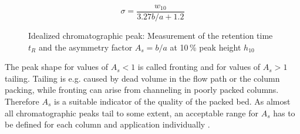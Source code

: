 \begin{equation}
\sigma=\frac{w_{10}}{3.27 b/a + 1.2}
\label{eq:Gaus_dev}
\end{equation}

\begin{figure}[h]
\centering
{}
\caption[Idealized chromatographic peak]{Idealized chromatographic peak: Measurement of the retention time $t_{R}$ and the asymmetry factor $A_{s}=b/a$ at 10\,\% peak height $h_{10}$ 
\label{fig:peak_param}
}
\end{figure}

The peak shape for values of $A_{s} < 1$ is called fronting and for values of $A_{s} > 1$ tailing. Tailing is e.g. caused by dead volume in the flow path or the column packing, while fronting can arise from channeling in poorly packed columns. Therefore $A_{s}$ is a suitable indicator of the quality of the packed bed. As almost all chromatographic peaks tail to some extent, an acceptable range for $A_{s}$ has to be defined for each column and application individually \cite{SWB-414874366}.  

